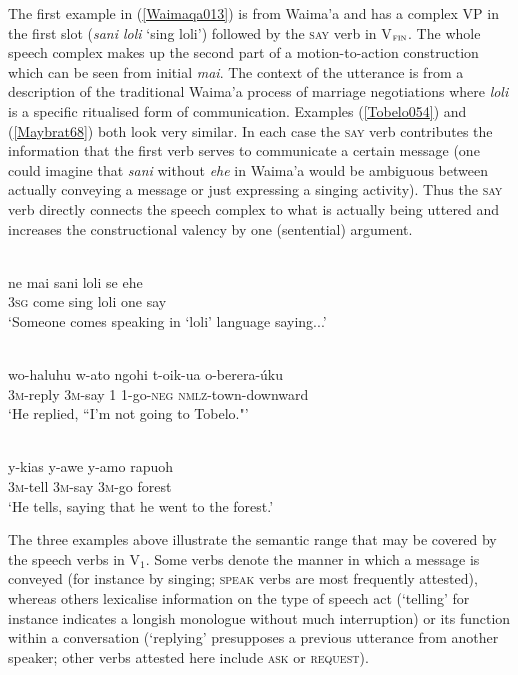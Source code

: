 The first example in (\ref{Waimaqa013}) is from Waima'a and has a complex VP in the first slot (\textit{sani loli} `sing loli') followed by the \textsc{say} verb in V$_{\textsc{fin}}$. The whole speech complex makes up the second part of a motion-to-action construction which can be seen from initial \textit{mai}. The context of the utterance is from a description of the traditional Waima'a process of marriage negotiations where \textit{loli} is a specific ritualised form of communication. Examples (\ref{Tobelo054}) and (\ref{Maybrat68}) both look very similar. In each case the \textsc{say} verb contributes the information that the first verb serves to communicate a certain message (one could imagine that \textit{sani} without \textit{ehe} in Waima'a would be ambiguous between actually conveying a message or just expressing a singing activity). Thus the \textsc{say} verb directly connects the speech complex to what is actually being uttered and increases the constructional valency by one (sentential) argument. 

\ea \label{Waimaqa013}
\\
\gll ne mai sani loli se ehe \\
\textsc{3}\textsc{sg} come sing loli one say \\
\glft `Someone comes speaking in `loli' language saying...'\\ 
\z

\ea \label{Tobelo054}
\\
\gll wo-haluhu w-ato ngohi t-oik-ua o-berera-úku \\
\textsc{3}\textsc{m}-reply \textsc{3}\textsc{m}-say \textsc{1} \textsc{1}-go-\textsc{neg} \textsc{nmlz}-town-downward \\
\glft `He replied, ``I'm not going to Tobelo."'\\ 
\z

\ea \label{Maybrat68}
\\
\gll y-kias y-awe y-amo rapuoh \\
\textsc{3}\textsc{m}-tell \textsc{3}\textsc{m}-say \textsc{3}\textsc{m}-go forest \\
\glft `He tells, saying that he went to the forest.'\\ 
\z

The three examples above illustrate the semantic range that may be covered by the speech verbs in V$_{1}$. Some verbs denote the manner in which a message is conveyed (for instance by singing; \textsc{speak} verbs are most frequently attested), whereas others lexicalise information on the type of speech act (`telling' for instance indicates a longish monologue without much interruption) or its function within a conversation (`replying' presupposes a previous utterance from another speaker; other verbs attested here include \textsc{ask} or \textsc{request}).


